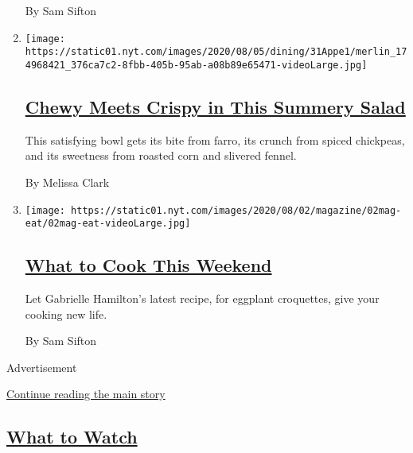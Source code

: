 \begin{enumerate}
  By Sam Sifton
\item
  \texttt{[image: https://static01.nyt.com/images/2020/08/05/dining/31Appe1/merlin\_174968421\_376ca7c2-8fbb-405b-95ab-a08b89e65471-videoLarge.jpg]}

  \hypertarget{chewy-meets-crispy-in-this-summery-salad}{%
  \subsection{\texorpdfstring{\href{/2020/07/31/dining/farro-corn-chickpea-salad-recipe.html}{Chewy
  Meets Crispy in This Summery
  Salad}}{Chewy Meets Crispy in This Summery Salad}}\label{chewy-meets-crispy-in-this-summery-salad}}

  This satisfying bowl gets its bite from farro, its crunch from spiced
  chickpeas, and its sweetness from roasted corn and slivered fennel.

  By Melissa Clark
\item
  \texttt{[image: https://static01.nyt.com/images/2020/08/02/magazine/02mag-eat/02mag-eat-videoLarge.jpg]}

  \hypertarget{what-to-cook-this-weekend}{%
  \subsection{\texorpdfstring{\href{/2020/07/31/dining/what-to-cook-this-weekend.html}{What
  to Cook This
  Weekend}}{What to Cook This Weekend}}\label{what-to-cook-this-weekend}}

  Let Gabrielle Hamilton's latest recipe, for eggplant croquettes, give
  your cooking new life.

  By Sam Sifton
\end{enumerate}

Advertisement

\protect\hyperlink{after-mid1}{Continue reading the main story}

\hypertarget{what-to-watch}{%
\subsection{\texorpdfstring{\protect\hyperlink{}{What to
Watch}}{What to Watch}}\label{what-to-watch}}

